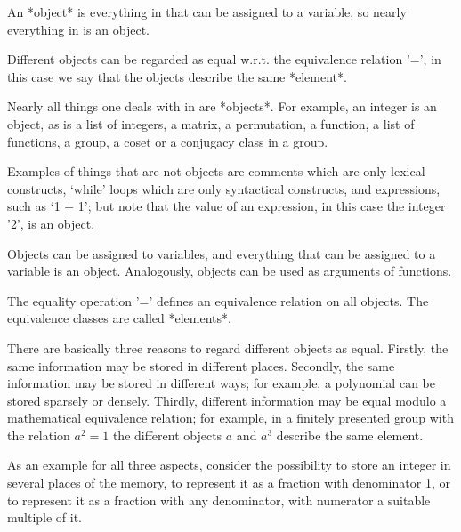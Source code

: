 

An *object* is everything in {\GAP} that can be assigned to a variable,
so nearly everything in {\GAP} is an object.

Different objects can be regarded as equal w.r.t. the equivalence
relation '=',
in this case we say that the objects describe the same *element*.



Nearly all things one deals with in {\GAP} are *objects*.
For example, an integer is an object, as is a list of integers, a matrix,
a permutation, a function, a list of functions, a group,
a coset or a conjugacy class in a group.

Examples of things that are not objects are
comments which are only lexical constructs,
`while' loops which are only syntactical constructs,
and expressions, such as `1 + 1';
but note that the value of an expression, in this case the integer '2',
is an object.

Objects can be assigned to variables,
and everything that can be assigned to a variable is an object.
Analogously, objects can be used as arguments of functions.


The equality operation '=' defines an equivalence relation on all {\GAP}
objects.
The equivalence classes are called *elements*.

There are basically three reasons to regard different objects as equal.
Firstly, the same information may be stored in different places.
Secondly, the same information may be stored in different ways;
for example, a polynomial can be stored sparsely or densely.
Thirdly, different information may be equal modulo a mathematical
equivalence relation;
for example, in a finitely presented group with the relation $a^2 = 1$
the different objects $a$ and $a^3$ describe the same element.

As an example for all three aspects, consider the possibility to store
an integer in several places of the memory,
to represent it as a fraction with denominator 1,
or to represent it as a fraction with any denominator, with numerator
a suitable multiple of it.

